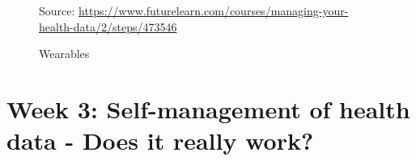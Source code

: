 \documentclass[10pt, twoside]{article}   	%
\begin{document}
\begin{figure}
\begin{subfigure}[b]{0.37\textwidth}
\end{subfigure}
\hfill


             {\scriptsize%
             Source: \url{https://www.futurelearn.com/courses/managing-your-health-data/2/steps/473546}}
  \caption{Wearables}
  \label{fig:Wearables}
\end{figure}
\pagebreak
\section{Week 3: Self-management of health data - Does it really work?}
\end{document}
